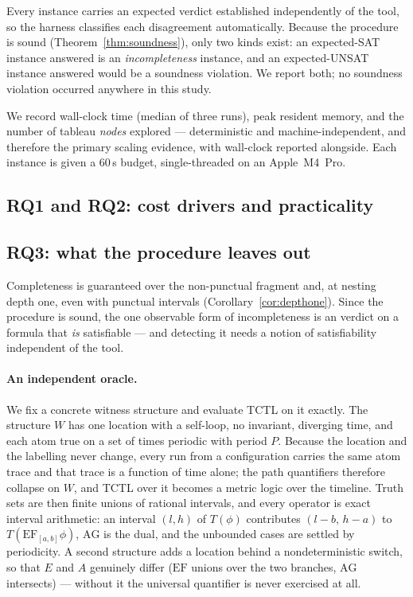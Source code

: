 Every instance carries an expected verdict established independently of the tool, so the harness
classifies each disagreement automatically. Because the procedure is sound (Theorem~\ref{thm:soundness}),
only two kinds exist: an expected-SAT instance answered \UNSAT{} is an \emph{incompleteness}
instance, and an expected-UNSAT instance answered \SAT{} would be a soundness violation. We report
both; no soundness violation occurred anywhere in this study.

We record wall-clock time (median of three runs), peak resident memory, and the number of tableau
\emph{nodes} explored --- deterministic and machine-independent, and therefore the primary scaling
evidence, with wall-clock reported alongside. Each instance is given a $60$\,s budget,
single-threaded on an Apple~M4~Pro.

\subsection{RQ1 and RQ2: cost drivers and practicality}\label{ss:rq12}




\subsection{RQ3: what the procedure leaves out}\label{ss:rq3}

Completeness is guaranteed over the non-punctual fragment and, at nesting depth one, even with
punctual intervals (Corollary~\ref{cor:depthone}). Since the procedure is sound, the one observable
form of incompleteness is an \UNSAT{} verdict on a formula that \emph{is} satisfiable --- and
detecting it needs a notion of satisfiability independent of the tool.

\paragraph{An independent oracle.}
We fix a concrete witness structure and evaluate TCTL on it exactly. The structure $W$ has one
location with a self-loop, no invariant, diverging time, and each atom true on a set of times
periodic with period $P$. Because the location and the labelling never change, every run from a
configuration carries the same atom trace and that trace is a function of time alone; the path
quantifiers therefore collapse on $W$, and TCTL over it becomes a metric logic over the timeline.
Truth sets are then finite unions of rational intervals, and every operator is exact interval
arithmetic: an interval $(l,h)$ of $T(\phi)$ contributes $(l-b,\,h-a)$ to
$T(\mathrm{EF}_{[a,b]}\phi)$, $\mathrm{AG}$ is the dual, and the unbounded cases are settled by
periodicity. A second structure adds a location behind a nondeterministic switch, so that $E$ and
$A$ genuinely differ ($\mathrm{EF}$ unions over the two branches, $\mathrm{AG}$ intersects) --- without
it the universal quantifier is never exercised at all.

